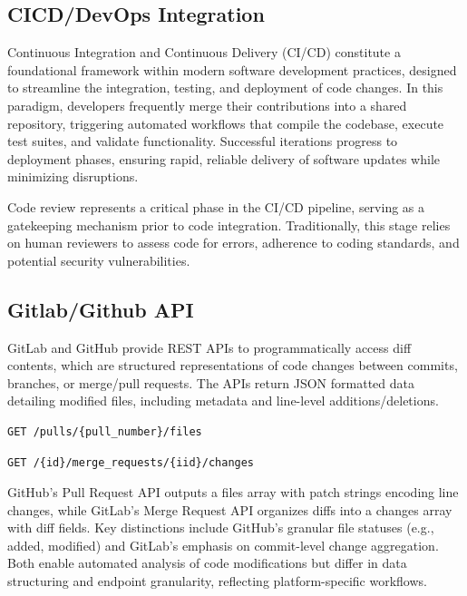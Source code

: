 \documentclass[12pt]{article}
\begin{document}
\subsection{CICD/DevOps Integration}
Continuous Integration and Continuous Delivery (CI/CD) constitute a foundational framework within modern software development practices, designed to streamline the integration, testing, and deployment of code changes. In this paradigm, developers frequently merge their contributions into a shared repository, triggering automated workflows that compile the codebase, execute test suites, and validate functionality. Successful iterations progress to deployment phases, ensuring rapid, reliable delivery of software updates while minimizing disruptions. \cite{AIDrivenDevops}

Code review represents a critical phase in the CI/CD pipeline, serving as a gatekeeping mechanism prior to code integration. Traditionally, this stage relies on human reviewers to assess code for errors, adherence to coding standards, and potential security vulnerabilities. \cite{aiDrivenAgile}

\subsection{Gitlab/Github API}
GitLab and GitHub provide REST APIs to programmatically access diff contents, which are structured representations of code changes between commits, branches, or merge/pull requests. The APIs return JSON formatted data detailing modified files, including metadata and line-level additions/deletions.


\lstset{basicstyle=\ttfamily, frame=single, language=JavaScript}
\begin{lstlisting}[caption={Github Patches API Endpoint}, label={lst:github-patches}]
GET /pulls/{pull_number}/files
\end{lstlisting}

\lstset{basicstyle=\ttfamily, frame=single, language=JavaScript}
\begin{lstlisting}[caption={Gitlab Diffs API Endpoint}, label={lst:gitlab-diffs}]
GET /{id}/merge_requests/{iid}/changes
\end{lstlisting}

GitHub's Pull Request API outputs a files array with patch strings encoding line changes, while GitLab's Merge Request API organizes diffs into a changes array with diff fields. Key distinctions include GitHub's granular file statuses (e.g., added, modified) and GitLab's emphasis on commit-level change aggregation. Both enable automated analysis of code modifications but differ in data structuring and endpoint granularity, reflecting platform-specific workflows.
\end{document}
